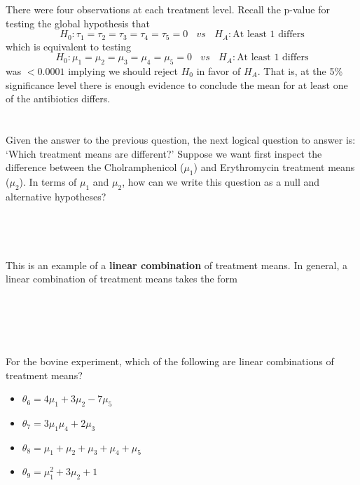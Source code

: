 There were four observations at each treatment level.  Recall the p-value for testing the global hypothesis that 
$$H_0: \tau_1=\tau_2=\tau_3=\tau_4=\tau_5=0~~~~vs~~~~H_A:\mbox{At least 1 differs}$$
which is equivalent to testing 
$$H_0: \mu_1=\mu_2=\mu_3=\mu_4=\mu_5=0~~~~vs~~~~H_A:\mbox{At least 1 differs}$$
was $<0.0001$ implying we should reject $H_0$ in favor of $H_A$.  That is, at the 5\% significance level there is enough evidence to conclude the mean for at least one of the antibiotics differs.\\~\\~\\
Given the answer to the previous question, the next logical question to answer is: `Which treatment means are different?'  Suppose we want first inspect the difference between the Cholramphenicol ($\mu_{1}$) and Erythromycin treatment means ($\mu_{2}$).  In terms of $\mu_{1}$ and $\mu_{2}$, how can we write this question as a null and alternative hypotheses?\\
~\\~\\~\\~\\
This is an example of a \textbf{linear combination} of treatment means.  In general, a linear combination of treatment means takes the form
\\~\\~\\~\\~\\~\\
For the bovine experiment, which of the following are linear combinations of treatment means?
\begin{itemize}
    \item $\theta_6=4\mu_{1}+3\mu_{2}-7\mu_{5}$ %
    \item $\theta_7=3\mu_{1}\mu_{4}+2\mu_{3}$     %
    \item $\theta_8=\mu_{1}+\mu_{2}+\mu_{3}+\mu_{4}+\mu_{5}$  %
    \item $\theta_9=\mu_{1}^2+3\mu_{2}+1$   %
\end{itemize}

\newpage

